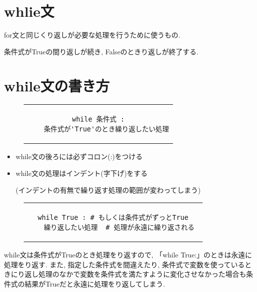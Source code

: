 \documentclass[dvipdfmx]{jsbook}
\newcommand{\info}[2]{\begin{tcolorbox}[colframe=gray, colback=black!10!white, coltitle=white, fonttitle=\bfseries, title={#1}]
{#2}\end{tcolorbox}}
\begin{document}
\section{whlie文}
for文と同じくり返しが必要な処理を行うために使うもの.  \par
条件式がTrueの間り返しが続き, Falseのときり返しが終了する.

\section{while文の書き方}
\begin{figure}[htp]
	\begin{tabular}{c}
		\begin{minipage}{.55\textwidth}
			\begin{lstlisting}[caption=while文の基本構文]
while 条件式 :
	条件式が'True'のとき繰り返したい処理\end{lstlisting}
		\end{minipage}
	\end{tabular}
\end{figure}

\begin{tcolorbox}[colframe=red!75!black,
		colback=red!10!white,
		coltitle=white, fonttitle=\bfseries,
		title=注意]
	\begin{itemize}
		\item while文の後ろには必ずコロン(:)をつける
		\item while文の処理はインデント(字下げ)をする \par
		      (インデントの有無で繰り返す処理の範囲が変わってしまう)
	\end{itemize}
\end{tcolorbox}

\begin{figure}[htp]
	\begin{tabular}{c}
		\begin{minipage}{.55\textwidth}
			\begin{lstlisting}[caption=while文の注意点]
while True : # もしくは条件式がずっとTrue
	繰り返したい処理  # 処理が永遠に繰り返される \end{lstlisting}
		\end{minipage}
	\end{tabular}
\end{figure}

\info{while文の注意点}{
	while文は条件式がTrueのとき処理をり返すので, 「while True:」のときは永遠に処理を\ruby{繰}{く}り返す.
	また, 指定した条件式を間違えたり, 条件式で変数を使っているときに\ruby{繰}{く}り返し処理のなかで変数を条件式を満たすように変化させなかった場合も条件式の結果がTrueだと永遠に処理を\ruby{繰}{く}り返してしまう.}
\end{document}
